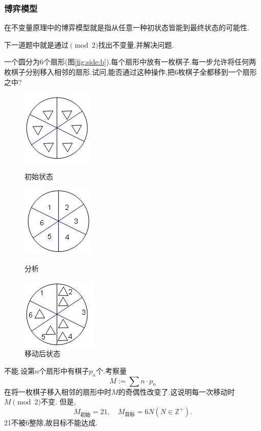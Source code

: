 \subsubsection{博弈模型}
在不变量原理中的博弈模型就是指从任意一种初状态皆能到最终状态的可能性.

下一道题中就是通过$\pmod 2$找出不变量,并解决问题.
\begin{problem}
    一个圆分为6个扇形(图\ref{fig:side:b}).每个扇形中放有一枚棋子.每一步允许将任何两枚棋子分别移入相邻的扇形.试问,能否通过这种操作,把6枚棋子全都移到一个扇形之中?
    \begin{figure}
        \begin{minipage}[t]{0.5\linewidth}
        \centering
        \includegraphics{graphics/circ1.png}
        \caption{初始状态}
        \label{fig:side:a}
        \end{minipage}%
        \begin{minipage}[t]{0.5\linewidth}
        \centering
        \includegraphics{graphics/circ2.png}
        \caption{分析}
        \label{fig:side:b}
        \end{minipage}
        \begin{minipage}[t]{0.5\linewidth}
            \centering
            \includegraphics{graphics/circ3.png}
            \caption{移动后状态}
            \label{fig:side:c}
            \end{minipage}
        \end{figure}
        
\end{problem}
\begin{solution}
    不能.设第$n$个扇形中有棋子$p_n$个.考察量$$
        M:=\sum n\cdot p_n
    $$
    在将一枚棋子移入相邻的扇形中时$M$的奇偶性改变了.这说明每一次移动时$M\pmod2$不变.
    但是,$$M_\text{初始}=21,\quad M_\text{目标}=6N(N\in\mathbb{Z}^{+}).$$21不被6整除,故目标不能达成.
\end{solution}